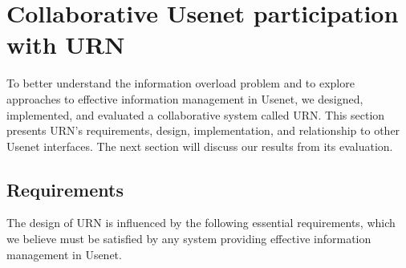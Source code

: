
\section{Collaborative Usenet participation with URN}

To better understand the information overload problem and to explore
approaches to effective information management in Usenet, we designed,
implemented, and evaluated a collaborative system called URN.  This section
presents URN's requirements, design, implementation, and relationship
to other Usenet interfaces.  The next section will discuss our results from
its evaluation.

\subsection{Requirements}

The design of URN is influenced by the following essential requirements,
which we believe must be satisfied by any system providing effective
information management in Usenet.


